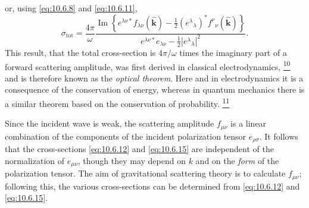 or, using \eqref{eq:10.6.8} and \eqref{eq:10.6.11},
\begin{equation}
  \sigma_{\mathrm{tot}}
  =
  \frac{4\pi}{\omega}
  \frac{
    \operatorname{Im}\!\left\{
      e^{\lambda\nu*}f_{\lambda\nu}(\widehat{\mathbf{k}})
      -\frac12(e^\lambda{}_\lambda)^*
      f^\nu{}_\nu(\widehat{\mathbf{k}})
    \right\}
  }{
    e^{\lambda\nu*}e_{\lambda\nu}
    -\frac12\left|e^\lambda{}_\lambda\right|^2
  }.
  \tag{10.6.15}\label{eq:10.6.15}
\end{equation}
This result, that the total cross-section is \(4\pi/\omega\) times the
imaginary part of a forward scattering amplitude, was first derived in
classical electrodynamics,%
\hyperref[ch10-ref-10]{\textsuperscript{10}}
and is therefore known as the \emph{optical theorem}. Here and in
electrodynamics it is a consequence of the conservation of energy, whereas
in quantum mechanics there is a similar theorem based on the conservation of
probability.%
\hyperref[ch10-ref-11]{\textsuperscript{11}}

Since the incident wave is weak, the scattering amplitude \(f_{\mu\nu}\) is
a linear combination of the components of the incident polarization tensor
\(e_{\rho\sigma}\). It follows that the cross-sections
\eqref{eq:10.6.12} and \eqref{eq:10.6.15} are independent of the
normalization of \(e_{\mu\nu}\), though they may depend on \(k\) and on the
\emph{form} of the polarization tensor. The aim of gravitational scattering
theory is to calculate \(f_{\mu\nu}\); following this, the various
cross-sections can be determined from \eqref{eq:10.6.12} and
\eqref{eq:10.6.15}.
